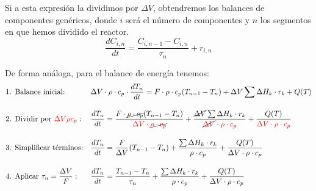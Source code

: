 \noindent Si a esta expresión la dividimos por $\Delta V$, obtendremos los balances de componentes genéricos, donde $i$ será el número de componentes y $n$ los segmentos en que hemos dividido el reactor.
\begin{equation}
    \frac{d C_{i,n}}{d t}=\frac{C_{i,n-1}-C_{i,n}}{\tau_n}+r_{i,n}
    \label{eq:rcfp-discreto}
\end{equation}

\noindent De forma análoga, para el balance de energía tenemos:
\begin{equation}
    \begin{alignedat}{2}
         & \text{1. Balance inicial:} \quad                                 &  & \Delta V \cdot \rho \cdot c_p \cdot \frac{dT_n}{dt} = F \cdot \rho \cdot c_p (T_{n-1} - T_n) + \Delta V \sum \Delta H_k \cdot r_k + Q(T)                                                                                                                                                                                                        \\[10pt]
         & \text{2. Dividir por } \textcolor{red}{\Delta V \rho c_p}: \quad &  & \frac{dT_n}{dt} = \frac{F \cdot \cancel{\rho \cdot c_p} (T_{n-1} - T_n)}{\textcolor{red}{\Delta V} \cdot \cancel{\textcolor{red}{\rho \cdot c_p}}} + \frac{\cancel{\Delta V} \sum \Delta H_k \cdot r_k}{\cancel{\textcolor{red}{\Delta V}} \cdot \textcolor{red}{\rho \cdot c_p}} + \frac{Q(T)}{\textcolor{red}{\Delta V \cdot \rho \cdot c_p}} \\[10pt]
         & \text{3. Simplificar términos:} \quad                            &  & \frac{dT_n}{dt} = \frac{F}{\Delta V} (T_{n-1} - T_n) + \frac{\sum \Delta H_k \cdot r_k}{\rho \cdot c_p} + \frac{Q(T)}{\Delta V \cdot \rho \cdot c_p}                                                                                                                                                                                            \\[10pt]
         & \text{4. Aplicar } \tau_n = \frac{\Delta V}{F}: \quad            &  & \frac{dT_n}{dt} = \frac{T_{n-1} - T_n}{\tau_n} + \frac{\sum \Delta H_k \cdot r_k}{\rho \cdot c_p} + \frac{Q(T)}{\Delta V \cdot \rho \cdot c_p}
    \end{alignedat}
\end{equation}


